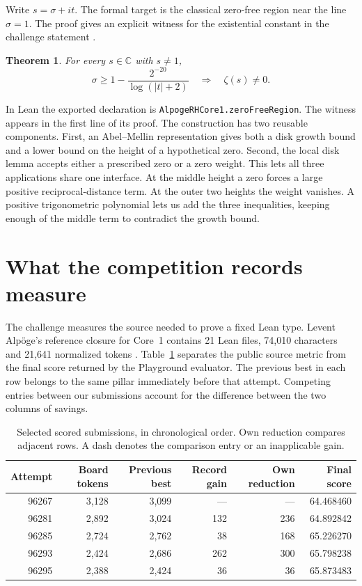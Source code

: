 \documentclass[11pt,a4paper]{article}
\newcommand{\lean}[1]{\nolinkurl{#1}}
\newtheorem*{maintheorem}{Theorem}
\begin{document}
Write \(s=\sigma+it\). The formal target is the classical zero-free
region near the line \(\sigma=1\). The proof gives an explicit witness
for the existential constant in the challenge statement \cite{task}.
\begin{maintheorem}
For every \(s\in\mathbb C\) with \(s\ne 1\),
\[
   \sigma\ge 1-\frac{2^{-20}}{\log(|t|+2)}
   \quad\Longrightarrow\quad \zeta(s)\ne 0 .
\]
\end{maintheorem}
In Lean the exported declaration is \lean{AlpogeRHCore1.zeroFreeRegion}.
The witness appears in the first line of its proof. The construction
has two reusable components. First, an Abel--Mellin representation gives
both a disk growth bound and a lower bound on the height of a hypothetical
zero. Second, the local disk lemma accepts either a prescribed zero or
a zero weight. This lets all three applications share one interface. At
the middle height a zero forces a large positive reciprocal-distance term.
At the outer two heights the weight vanishes. A positive trigonometric
polynomial lets us add the three inequalities, keeping enough of the
middle term to contradict the growth bound.





\section{What the competition records measure}
\label{sec:records}
The challenge measures the source needed to prove a fixed Lean type.
Levent Alp\"oge's reference closure for Core~1 contains 21 Lean files,
74,010 characters and 21,641 normalized tokens \cite{task}. Table~\ref{tab:runs}
separates the public source metric from the final score returned by the
Playground evaluator. The previous best in each row belongs to the same
pillar immediately before that attempt. Competing entries between our
submissions account for the difference between the two columns of savings.

\begin{table}[htbp]
\centering\small
\begin{tabular}{@{}rrrrrr@{}}
\toprule
Attempt & Board tokens & Previous best & Record gain & Own reduction & Final score\\
\midrule
96267 & 3,128 & 3,099 & --- & --- & 64.468460\\
96281 & 2,892 & 3,024 & 132 & 236 & 64.892842\\
96285 & 2,724 & 2,762 & 38  & 168 & 65.226270\\
96293 & 2,424 & 2,686 & 262 & 300 & 65.798238\\
96295 & 2,388 & 2,424 & 36  & 36  & 65.873483\\
\bottomrule
\end{tabular}
\caption{Selected scored submissions, in chronological order. Own reduction
compares adjacent rows. A dash denotes the comparison entry or an inapplicable gain.}
\label{tab:runs}
\end{table}
\end{document}
